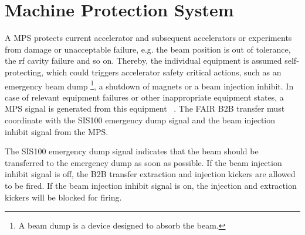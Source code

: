 \section{Machine Protection System}
A \gls{MPS} protects current accelerator and subsequent accelerators or experiments from damage or unacceptable failure, e.g. the beam position is out of tolerance, the rf cavity failure and so on. Thereby, the individual equipment is assumed self-protecting, which could triggers accelerator safety critical actions, such as an emergency beam dump \footnote{A beam dump is a device designed to absorb the beam.}, a shutdown of magnets or a beam injection inhibit. In case of relevant equipment failures or other inappropriate equipment states, a MPS signal is generated from this equipment ~\cite{mandakovic_fair_????}. The FAIR B2B transfer must coordinate with the SIS100 emergency dump signal and the beam injection inhibit signal from the MPS. 

The SIS100 emergency dump signal indicates that the beam should be transferred to the emergency dump as soon as possible. If the beam injection inhibit signal is off, the B2B transfer extraction and injection kickers are allowed to be fired. If the beam injection inhibit signal is on, the injection and extraction kickers will be blocked for firing. 






